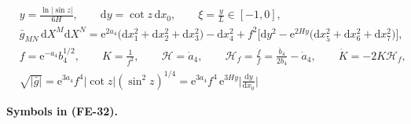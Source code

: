 \documentclass[
  10pt,
]{article}
\begin{document}
\[
\begin{aligned}
&y = \frac{\ln\lvert\sin z\rvert}{6H},\qquad \mathrm{d}y = \cot z\,\mathrm{d}x_0,\qquad \xi =
 \frac{y}{L}\in[-1, 0],\\
&\bar g_{MN}\,\mathrm{d}X^M\mathrm{d}X^N = \mathrm{e}^{2a_4}\big(\mathrm{d}x_1^2 + \mathrm{d}x_2^2 +
 \mathrm{d}x_3^2\big)
 - \mathrm{d}x_4^2 + f^2\Big[\mathrm{d}y^2 - \mathrm{e}^{2Hy}\big(\mathrm{d}x_5^2 + \mathrm{d}x_6^2 +
 \mathrm{d}x_7^2\big)\Big],\\
&f = \mathrm{e}^{-a_4}b_4^{1/2},\qquad K = \frac{1}{f^2},\qquad \mathcal{H} = \dot a_4,\qquad
 \mathcal{H}_f = \frac{\dot f}{f} = \frac{\dot b_4}{2b_4} - \dot a_4,\qquad \dot K = -2K\mathcal{H}_f,\\
&\sqrt{\lvert\bar g\rvert} = \mathrm{e}^{3a_4}f^4\lvert\cot z\rvert(\sin^2z)^{1/4}
 = \mathrm{e}^{3a_4}f^4\,\mathrm{e}^{3Hy}\Big\lvert\frac{\mathrm{d}y}{\mathrm{d}x_0}\Big\rvert
\end{aligned} \tag{FE-32}
\]

\textbf{Symbols in (FE-32).}
\end{document}
